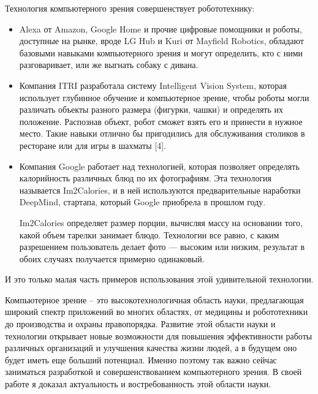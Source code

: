 \documentclass[bachelor, och, referat, times]{SCWorks}
\begin{document}
Технология компьютерного зрения совершенствует робототехнику:

\begin{itemize}
\item Alexa от Amazon, Google Home и прочие цифровые помощники и роботы, доступные на рынке, вроде LG Hub и Kuri от Mayfield Robotics, обладают базовыми навыками компьютерного зрения и могут определить, кто с ними разговаривает, или же выгнать собаку с дивана.

\item Компания ITRI разработала систему Intelligent Vision System, которая использует глубинное обучение и компьютерное зрение, чтобы роботы могли различать объекты разного размера (фигурки, чашки) и определять их положение. Распознав объект, робот сможет взять его и принести в нужное место. Такие навыки отлично бы пригодились для обслуживания столиков в ресторане или для игры в шахматы [4].

\item Компания Google работает над технологией, которая позволяет определять калорийность различных блюд по их фотографиям. Эта технология называется Im2Calories, и в ней используются предварительные наработки DeepMind, стартапа, который Google приобрела в прошлом году.

Im2Calories определяет размер порции, вычисляя массу на основании того, какой объем тарелки занимает блюдо. Технологии все равно, с каким разрешением пользователь делает фото — высоким или низким, результат в обоих случаях получается примерно одинаковый.
\end{itemize}

И это только малая часть примеров использования этой удивительной технологии.

\conclusion
Компьютерное зрение – это высокотехнологичная область науки, предлагающая   широкий спектр приложений во многих областях, от медицины и робототехники до производства и охраны правопорядка. Развитие этой области науки и технологии   открывает новые возможности для повышения эффективности работы различных   организаций и улучшения качества жизни людей, а в будущем оно будет иметь еще больший потенциал. Именно поэтому так важно сейчас заниматься разработкой и совершенствованием компьютерного зрения. В своей работе я доказал актуальность и востребованность этой области науки.
\end{document}
